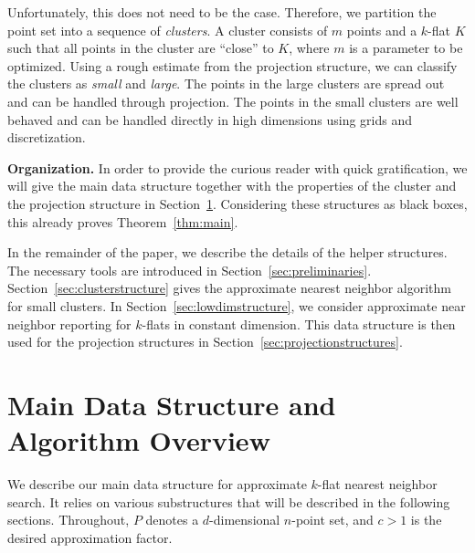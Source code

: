 \documentclass[a4paper,11pt]{paper}
\begin{document}
Unfortunately, this does not need to be the case.
Therefore, we partition the point set into a sequence
of \emph{clusters}.
A cluster consists of $m$ points and a $k$-flat $K$
such that all points in the cluster are ``close'' to $K$,
where $m$ is a parameter to be optimized.
Using a rough estimate from the projection structure, we can
classify the clusters as \emph{small} and \emph{large}.
The points in the large clusters are spread out and
can be handled through projection. The points in the small
clusters are well behaved and can be handled directly
in high dimensions using grids and discretization.

\noindent
\textbf{Organization.}
In order to provide the curious reader with quick gratification,
we will give the main data structure together with the properties
of the cluster and the projection structure in
Section~\ref{sec:mainDS}.  Considering these structures as
black boxes, this already proves Theorem~\ref{thm:main}.

In the remainder of the paper, we describe the details of the
helper structures. The necessary tools are introduced
in Section~\ref{sec:preliminaries}. Section~\ref{sec:clusterstructure}
gives the approximate nearest neighbor algorithm for small clusters.
In Section~\ref{sec:lowdimstructure}, we consider approximate
near neighbor reporting for $k$-flats in constant dimension.
This data structure is then used for the projection
structures in Section~\ref{sec:projectionstructures}.

\section{Main Data Structure and Algorithm Overview}
\label{sec:mainDS}

We describe our main data structure for approximate
$k$-flat nearest neighbor search. It relies on various substructures
that will be described in the following sections.
Throughout, $P$ denotes a $d$-dimensional $n$-point set,
and $c > 1$ is the desired approximation factor.
\end{document}
